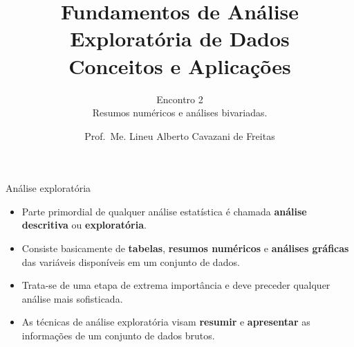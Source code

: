 \documentclass[
  ignorenonframetext,
  serif,
  professionalfont,
  usenames,
  dvipsnames,
  aspectratio = 169]{beamer}
\title{\hfill\break
\textbf{Fundamentos de Análise Exploratória de Dados}\\
Conceitos e Aplicações}
\subtitle{\hfill\break
Encontro 2\\
Resumos numéricos e análises bivariadas.}
\author{Prof.~Me. Lineu Alberto Cavazani de Freitas \vspace{-0.5cm}}
\date{}
\begin{document}
\frame{\titlepage}

\begin{frame}{Análise exploratória}
\label{anuxe1lise-exploratuxf3ria}
\begin{itemize}
\item
  Parte primordial de qualquer análise estatística é chamada
  \textbf{análise descritiva} ou \textbf{exploratória}.
\item
  Consiste basicamente de \textbf{tabelas}, \textbf{resumos numéricos} e
  \textbf{análises gráficas} das variáveis disponíveis em um conjunto de
  dados.
\item
  Trata-se de uma etapa de extrema importância e deve preceder qualquer
  análise mais sofisticada.
\item
  As técnicas de análise exploratória visam \textbf{resumir} e
  \textbf{apresentar} as informações de um conjunto de dados brutos.
\end{itemize}
\end{frame}
\end{document}
